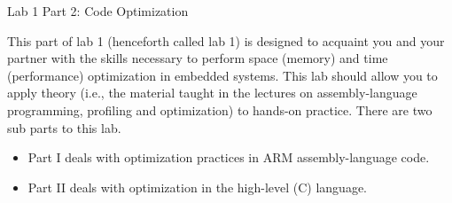\documentclass{article}
\begin{document}
\begin{section}{Lab 1 Part 2: Code Optimization}

		This part of lab 1 (henceforth called lab 1) is designed to acquaint you and your partner
		with the skills necessary to perform space (memory)
		and time (performance) optimization in embedded
		systems. This lab should allow you to apply theory
		(i.e., the material taught in the lectures on
		assembly-language programming, profiling and
		optimization) to hands-on practice.  There are two
		sub parts to this lab.

		\begin{itemize}
			\item Part I deals with optimization practices
			in ARM assembly-language code.
			\item Part II deals with optimization in the
			high-level (C) language.
		\end{itemize}
	\end{section}
\end{document}
